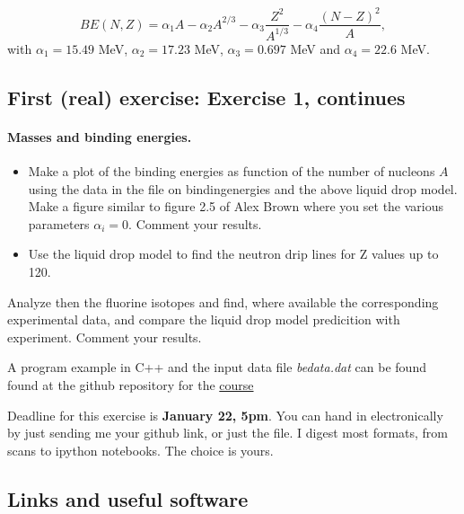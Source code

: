 \documentclass[%
oneside,                 %
final,                   %
10pt]{article}
\begin{document}
\noindent
\[
BE(N,Z)= \alpha_1A-\alpha_2A^{2/3}-\alpha_3\frac{Z^2}{A^{1/3}}-\alpha_4\frac{(N-Z)^2}{A},
\]
with $\alpha_1=15.49$ MeV, $\alpha_2=17.23$ MeV, $\alpha_3=0.697$ MeV and $\alpha_4=22.6$ MeV.





\subsection{First (real) exercise: Exercise 1, continues}

\paragraph{Masses and binding energies.}
\begin{itemize}
 \item Make a plot of the binding energies as function of the number of nucleons $A$ using the data in the file on bindingenergies and the above liquid drop model.  Make a figure similar to figure 2.5 of Alex Brown where you set the various parameters $\alpha_i=0$. Comment your results. 

 \item Use the liquid drop model to find the neutron drip lines   for Z values up to 120.
\end{itemize}

\noindent
Analyze then the fluorine isotopes and find, where available the corresponding experimental data, and compare the liquid drop model predicition with experiment. 
Comment your results.

A program example in C++ and the input data file \emph{bedata.dat} can be found found at the github repository for the \href{{https://github.com/NuclearStructure/PHY981/tree/master/doc/pub/spdata/programs}}{course}

Deadline for this exercise is \textbf{January 22, 5pm}.  You can hand in electronically by just sending me your github link, or just the file. I digest most formats, from scans to ipython notebooks. The choice is yours.






\subsection{Links and useful software}
\end{document}
